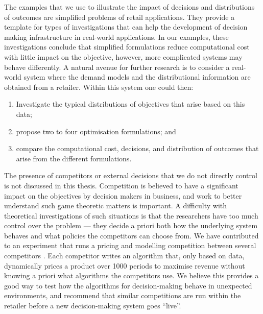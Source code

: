\documentclass[main.tex]{subfiles}
\begin{document}
The examples that we use to illustrate the impact of decisions and
distributions of outcomes are simplified problems of retail
applications. They provide a template for types of investigations that
can help the development of decision making infrastructure in
real-world applications.  In our examples, these investigations
conclude that simplified formulations reduce computational cost with
little impact on the objective, however, more complicated systems may
behave differently.  A natural avenue for further research is to
consider a real-world system where the demand models and the
distributional information are obtained from a retailer. Within this
system one could then:
\begin{enumerate}
\item Investigate the typical distributions of objectives that arise
  based on this data;
\item propose two to four optimisation formulations; and
\item compare the computational cost, decisions, and distribution of
  outcomes that arise from the different formulations.
\end{enumerate}

The presence of competitors or external decisions that we do not
directly control is not discussed in this thesis. Competition is
believed to have a significant impact on the objectives by decision
makers in business, and work to better understand such game theoretic
matters is important. A difficulty with theoretical investigations of
such situations is that the researchers have too much control over
the problem --- they decide a priori both how the underlying system
behaves and what policies the competitors can choose from.  We have
contributed to an experiment that runs a pricing and modelling
competition between several competitors \citep{geer2018dynamic}.  Each
competitor writes an algorithm that, only based on data, dynamically
prices a product over \num{1000} periods to maximise revenue without
knowing a priori what algorithms the competitors use. We believe this
provides a good way to test how the algorithms for decision-making
behave in unexpected environments, and recommend that similar
competitions are run within the retailer before a new decision-making
system goes ``live''.



\biblio{} %
\end{document}

